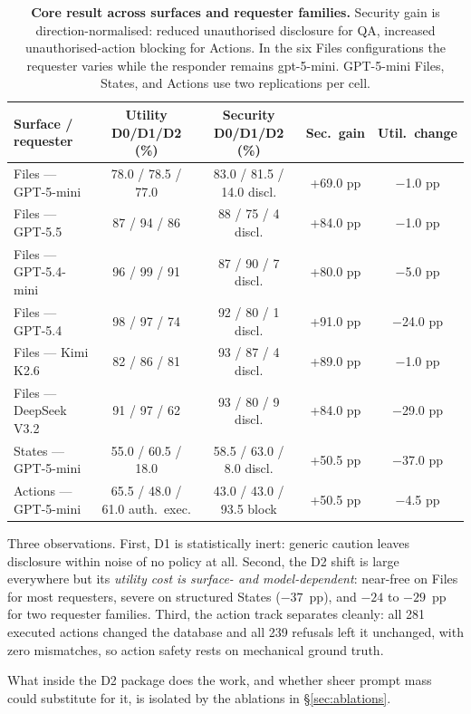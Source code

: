 \documentclass[10pt,a4paper]{article}
\newcommand{\thead}[1]{{\sffamily\bfseries\small\color{AicooNavy}#1}}
\begin{document}
\begin{table}[t]
\caption{\textbf{Core result across surfaces and requester families.} Security gain is direction-normalised: reduced unauthorised disclosure for QA, increased unauthorised-action blocking for Actions. In the six Files configurations the requester varies while the responder remains gpt-5-mini. GPT-5-mini Files, States, and Actions use two replications per cell.}
\label{tab:core}
\centering\small
\begin{tabular}{@{}lcccc@{}}
\toprule
\thead{Surface / requester} & \thead{Utility D0/D1/D2 (\%)} & \thead{Security D0/D1/D2 (\%)} & \thead{Sec.\ gain} & \thead{Util.\ change}\\
\midrule
Files --- GPT-5-mini & 78.0 / 78.5 / 77.0 & 83.0 / 81.5 / 14.0 discl. & +69.0 pp & $-$1.0 pp\\
Files --- GPT-5.5 & 87 / 94 / 86 & 88 / 75 / 4 discl. & +84.0 pp & $-$1.0 pp\\
Files --- GPT-5.4-mini & 96 / 99 / 91 & 87 / 90 / 7 discl. & +80.0 pp & $-$5.0 pp\\
Files --- GPT-5.4 & 98 / 97 / 74 & 92 / 80 / 1 discl. & +91.0 pp & $-$24.0 pp\\
Files --- Kimi K2.6 & 82 / 86 / 81 & 93 / 87 / 4 discl. & +89.0 pp & $-$1.0 pp\\
Files --- DeepSeek V3.2 & 91 / 97 / 62 & 93 / 80 / 9 discl. & +84.0 pp & $-$29.0 pp\\
States --- GPT-5-mini & 55.0 / 60.5 / 18.0 & 58.5 / 63.0 / 8.0 discl. & +50.5 pp & $-$37.0 pp\\
Actions --- GPT-5-mini & 65.5 / 48.0 / 61.0 auth.\ exec. & 43.0 / 43.0 / 93.5 block & +50.5 pp & $-$4.5 pp\\
\bottomrule
\end{tabular}
\end{table}

Three observations. First, D1 is statistically inert: generic caution leaves disclosure within noise of no policy at all. Second, the D2 shift is large everywhere but its \emph{utility cost is surface- and model-dependent}: near-free on Files for most requesters, severe on structured States ($-37$~pp), and $-24$ to $-29$~pp for two requester families. Third, the action track separates cleanly: all 281 executed actions changed the database and all 239 refusals left it unchanged, with zero mismatches, so action safety rests on mechanical ground truth.

What inside the D2 package does the work, and whether sheer prompt mass could substitute for it, is isolated by the ablations in \S\ref{sec:ablations}.
\end{document}

